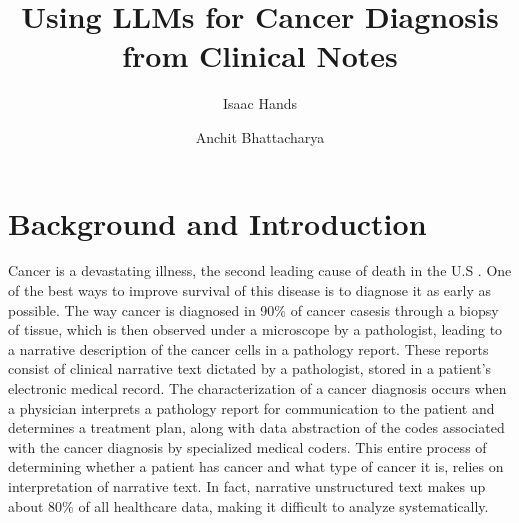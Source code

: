 \documentclass[manuscript,screen,review,nonacm]{acmart}
\begin{document}
\title{Using LLMs for Cancer Diagnosis from Clinical Notes}

\author{Isaac Hands}

\author{Anchit Bhattacharya}

\maketitle

\section{Background and Introduction}
Cancer is a devastating illness, the second leading cause of death in the U.S \cite{cdc1}. One of the best ways to improve survival of this disease is to diagnose it as early as possible\cite{cruk1}. The way cancer is diagnosed in 90\% of cancer cases\cite{cdc2}is through a biopsy of tissue, which is then observed under a microscope by a pathologist, leading to a narrative description of the cancer cells in a pathology report. These reports consist of clinical narrative text dictated by a pathologist, stored in a patient's electronic medical record. The characterization of a cancer diagnosis occurs when a physician interprets a pathology report for communication to the patient and determines a treatment plan, along with data abstraction of the codes associated with the cancer diagnosis by specialized medical coders. This entire process of determining whether a patient has cancer and what type of cancer it is, relies on interpretation of narrative text. In fact, narrative unstructured text makes up about 80\% of all healthcare data\cite{Kong:2019tl}, making it difficult to analyze systematically. 
\end{document}
